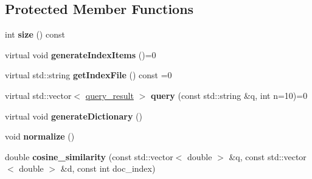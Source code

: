 \subsection*{Protected Member Functions}
\begin{DoxyCompactItemize}
\item 
\mbox{\label{classindexer_a6e30ca200401d5b7ea2b9fe944d367b6}} 
int {\bfseries size} () const
\item 
\mbox{\label{classindexer_a7aa98bdfd37121bbba06127f99325e84}} 
virtual void {\bfseries generate\+Index\+Items} ()=0
\item 
\mbox{\label{classindexer_af675f607be274dcd463291963ac3e730}} 
virtual std\+::string {\bfseries get\+Index\+File} () const =0
\item 
\mbox{\label{classindexer_adc2539219e227f664448927b7337b8dc}} 
virtual std\+::vector$<$ \hyperlink{classquery__result}{query\+\_\+result} $>$ {\bfseries query} (const std\+::string \&q, int n=10)=0
\item 
\mbox{\label{classindexer_a31f3dc3a078fb76377a20a56f52e1598}} 
virtual void {\bfseries generate\+Dictionary} ()
\item 
\mbox{\label{classindexer_afd19e249c5224de7b4b308c5420f2412}} 
void {\bfseries normalize} ()
\item 
\mbox{\label{classindexer_a7cfd3df59433c515df8344196fb2395a}} 
double {\bfseries cosine\+\_\+similarity} (const std\+::vector$<$ double $>$ \&q, const std\+::vector$<$ double $>$ \&d, const int doc\+\_\+index)
\end{DoxyCompactItemize}
